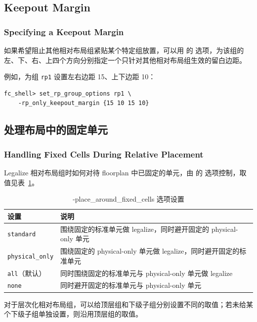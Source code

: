 \subsection{Keepout Margin}
\subsubsection*{Specifying a Keepout Margin}

如果希望阻止其他相对布局组紧贴某个特定组放置，可以用  的  选项，为该组的左、下、右、上四个方向分别指定一个只针对其他相对布局组生效的留白边距。

例如，为组 \texttt{rp1} 设置左右边距 15、上下边距 10：
\begin{lstlisting}
fc_shell> set_rp_group_options rp1 \
    -rp_only_keepout_margin {15 10 15 10}
\end{lstlisting}

\subsection{处理布局中的固定单元}
\subsubsection*{Handling Fixed Cells During Relative Placement}

Legalize 相对布局组时如何对待 floorplan 中已固定的单元，由  的  选项控制，取值见表~\ref{tab:rp-fixed}。

\begin{table}[htbp]
\centering
\caption{-place\_around\_fixed\_cells 选项设置}
\label{tab:rp-fixed}
\begin{tabularx}{\textwidth}{lX}
\toprule
设置 & 说明 \\
\midrule
\texttt{standard} & 围绕固定的标准单元做 legalize，同时避开固定的 physical-only 单元 \\
\texttt{physical\_only} & 围绕固定的 physical-only 单元做 legalize，同时避开固定的标准单元 \\
\texttt{all}（默认） & 同时围绕固定的标准单元与 physical-only 单元做 legalize \\
\texttt{none} & 同时避开固定的标准单元与 physical-only 单元 \\
\bottomrule
\end{tabularx}
\end{table}

对于层次化相对布局组，可以给顶层组和下级子组分别设置不同的取值；若未给某个下级子组单独设置，则沿用顶层组的取值。

